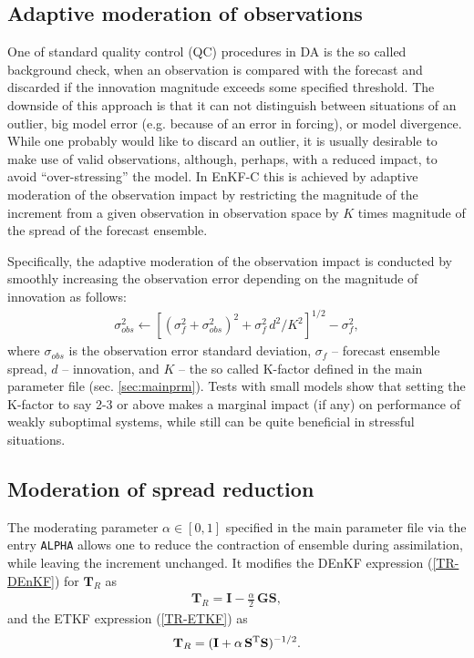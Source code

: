 \documentclass[11pt]{report}
\newcommand{\mb} {\mathbf}
\newcommand{\T}{^{\tiny \mathrm T}}
\begin{document}
\subsection{Adaptive moderation of observations}

One of standard quality control (QC) procedures in DA is the so called background check, when an observation is compared with the forecast and discarded if the innovation magnitude exceeds some specified threshold.
The downside of this approach is that it can not distinguish between situations of an outlier, big model error (e.g. because of an error in forcing), or model divergence.
While one probably would like to discard an outlier, it is usually desirable to make use of valid observations, although, perhaps, with a reduced impact, to avoid ``over-stressing'' the model.
In EnKF-C this is achieved by adaptive moderation of the observation impact by restricting the magnitude of the increment from a given observation in observation space by $K$ times magnitude of the spread of the forecast ensemble.

Specifically, the adaptive moderation of the observation impact is conducted by smoothly increasing the observation error depending on the magnitude of innovation as follows:
\begin{align*}
  \sigma^2_{obs} \leftarrow \left[(\sigma_{f}^2 + \sigma_{obs}^2)^2 + \sigma_f^2 \, d^2 / K^2\right]^{1/2} - \sigma_f^2,
\end{align*}
where $\sigma_{obs}$ is the observation error standard deviation, $\sigma_f$ -- forecast ensemble spread, $d$ -- innovation, and $K$ -- the so called K-factor defined in the main parameter file (sec. \ref{sec:mainprm}).
Tests with small models show that setting the K-factor to say 2-3 or above makes a marginal impact (if any) on performance of weakly suboptimal systems, while still can be quite beneficial in stressful situations.

\subsection{Moderation of spread reduction}

The moderating parameter $\alpha \in [0, 1]$ specified in the main parameter file via the entry \verb|ALPHA| allows one to reduce the contraction of ensemble during assimilation, while leaving the increment unchanged.
It modifies the DEnKF expression (\ref{TR-DEnKF}) for $\mb T_R$ as
\begin{align*}
  \mb T_R = \mb I - \frac{\alpha}{2} \, \mb G \mb S,
\end{align*}
and the ETKF expression (\ref{TR-ETKF}) as
\begin{align*}
  \mb T_R = (\mb I + \alpha \, \mb S\T \mb S)^{-1/2}.
\end{align*}
\end{document}
